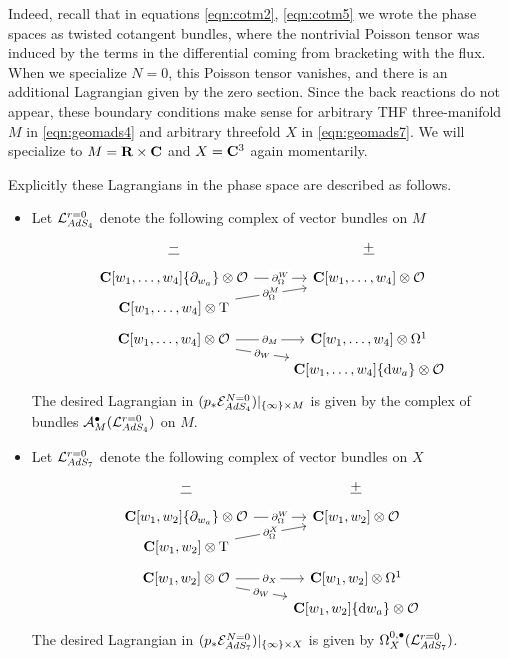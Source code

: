 \documentclass[../main.tex]{subfiles}
\begin{document}
Indeed, recall that in equations \eqref{eqn:cotm2}, \eqref{eqn:cotm5} we wrote the phase spaces as twisted cotangent bundles, where the nontrivial Poisson tensor was induced by the terms in the differential coming from bracketing with the flux. When we specialize $N=0$, this Poisson tensor vanishes, and there is an additional Lagrangian given by the zero section.
Since the back reactions do not appear, these boundary conditions make sense for arbitrary THF three-manifold $M$ in \eqref{eqn:geomads4} and arbitrary threefold $X$ in \eqref{eqn:geomads7}.
We will specialize to $M = \mathbf{R} \times \mathbf{C}$ and $X =\mathbf{C}^3$ again momentarily.

Explicitly these Lagrangians in the phase space are described as follows.
\begin{itemize}
\item Let $\mathcal{L}_{AdS_4}^{r=0}$ denote the following complex of vector bundles on $M$
 \begin{equation}
 \begin{tikzcd}[row sep = 1 ex]
   \ul{-} & \ul{+} \\
\C[w_1,\ldots, w_4] \{\partial_{w_a}\} \otimes \mc{O}\ar[r, "\del^W_\Omega" description] &\C[w_1,\ldots, w_4]  \otimes \mc O \\
\C[w_1,\ldots, w_4]   \otimes \T\ar[ur, "\del^M_\Omega" description] \\
\C[w_1,\ldots, w_4] \otimes \mc{O}\ar[r, "\del_M" description]\ar[dr, "\del_W" description] & \C[w_1,\ldots, w_4]\otimes \Omega^1 \\ & \C[w_1,\ldots, w_4] \{\d w_a\}  \otimes \mc O
\end{tikzcd}
\end{equation}
The desired Lagrangian in $(p_*\mathcal{E}^{N=0}_{AdS_4})|_{\{\infty\} \times M}$ is given by the complex of bundles $\mathcal A^\bullet_{M}(\mathcal{L}_{AdS_4}^{r=0})$ on $M$.

\item Let $\mathcal{L}_{AdS_7}^{r=0}$ denote the following complex of vector bundles on $X$
 \begin{equation}
 \begin{tikzcd}[row sep = 1 ex]
   \ul{-} & \ul{+} \\
\C[w_1, w_2] \{\partial_{w_a}\} \otimes \mc{O}\ar[r, "\del^W_\Omega" description] &\C[w_1,w_2]  \otimes \mc O \\
\C[w_1, w_2]   \otimes \T\ar[ur, "\del^X_\Omega" description] \\
\C[w_1, w_2] \otimes \mc{O}\ar[r, "\del_X" description]\ar[dr, "\del_W" description] & \C[w_1,w_2]\otimes \Omega^1 \\ & \C[w_1, w_2] \{\d w_a\}  \otimes \mc O
\end{tikzcd}
\end{equation}
The desired Lagrangian in $(p_*\mathcal{E}^{N=0}_{AdS_7})|_{\{\infty\} \times X}$ is given by $\Omega^{0,\bullet}_{X} (\mathcal{L}_{AdS_7}^{r=0})$.
\end{itemize}
\end{document}
